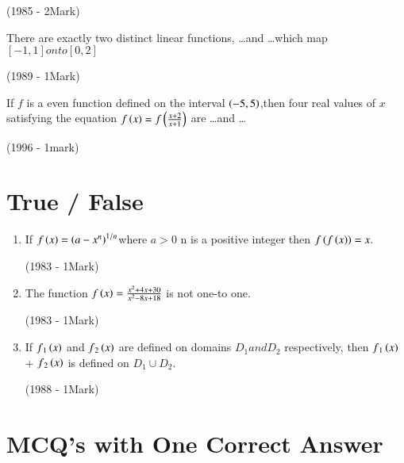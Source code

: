 \documentclass[journal]{IEEEtran}
\begin{document}
\begin{enumerate}
{    
    \hfill
    {(1985 - 2Mark)}
    
     
    \item There are exactly two distinct linear functions, \dots and \dots which map $[-1,1]onto [0,2]$
    
    \hfill
    {(1989 - 1Mark)}
    
    
    
     \item If $f$ is a even function defined on the 
    interval $\left(-5,5\right)$,then four real values of $x $
    satisfying the equation $f\left(x\right)=f\left({\frac{x+2}{x+1}}\right)$
    are \dots  and \dots 
    
    
    \hfill   (1996 - 1mark)
    }
\end{enumerate}





\section{ True / False}




\begin{enumerate}

\item If  $f\left(x\right)=\left(a-x^n\right)^{1/n}$where $a>0$ n is a positive integer 
then $f\left(f\left(x\right)\right)=x.$


 \hfill 
 {(1983 - 1Mark)}


 
\item The function $f\left(x\right)={\frac{x^2+4x+30}{x^2-8x+18}}$ is not one-to one.


\hfill
{(1983 - 1Mark)}




\item If $f{_1}\left(x\right)$
 and  $f{_2}\left(x\right)$ are  defined on domains $D{_1} and D{_2}$ respectively, then $f{_1}\left(x\right)$ + $f{_2}\left(x\right)$ is defined on $D{_1}\cup D{_2}$.


\hfill
{(1988 - 1Mark)}
\end{enumerate}




\section{ MCQ's with One Correct Answer}



 
\end{document}
